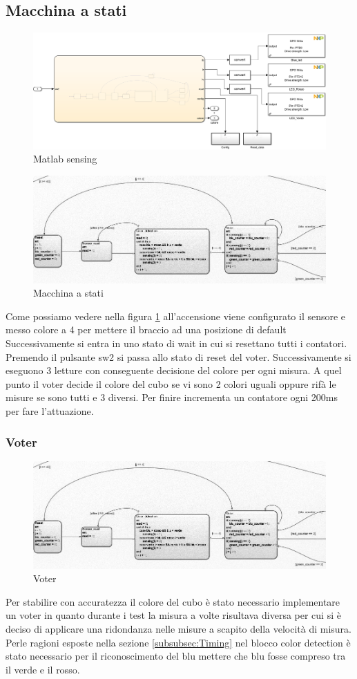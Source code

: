\documentclass[a4paper,12pt]{report}
\begin{document}
\subsection{Macchina a stati}
\begin{figure}[h] 
    \centering
    \includegraphics[width=0.6\linewidth]{images/Immagini sensore/Sensing e macchina a stati.png}
    \caption{Matlab sensing}
    \end{figure}
\begin{figure}[h]
    \includegraphics[width=0.8\linewidth]{images/Immagini sensore/sensor_chart.png}
    \caption{Macchina a stati}
    \label{fig:stateflow}
\end{figure}
Come possiamo vedere nella figura \ref{fig:stateflow} all'accensione viene configurato il sensore e messo colore a 4 per mettere il braccio ad una posizione di default Successivamente si entra in uno stato di wait in cui si resettano tutti i contatori. Premendo il pulsante sw2 si passa allo stato di reset del voter. Successivamente si eseguono 3 letture con conseguente decisione del colore per ogni misura. A quel punto il voter decide il colore del cubo se vi sono 2 colori uguali oppure rifà le misure se sono tutti e 3 diversi. Per finire incrementa un contatore ogni 200ms per fare l'attuazione.
\subsubsection{Voter}
\begin{figure}[h] 
    \centering
    \includegraphics[width=0.75\linewidth]{images/Immagini sensore/voter.png}
    \caption{Voter}
\end{figure}
Per stabilire con accuratezza il colore del cubo è stato necessario implementare un voter in quanto durante i test la misura a volte risultava diversa per cui si è deciso di applicare una ridondanza nelle misure a scapito della velocità di misura. Perle ragioni esposte nella sezione \ref{subsubsec:Timing} nel blocco color detection è stato necessario per il riconoscimento del blu mettere che blu fosse compreso tra il verde e il rosso.
\end{document}
